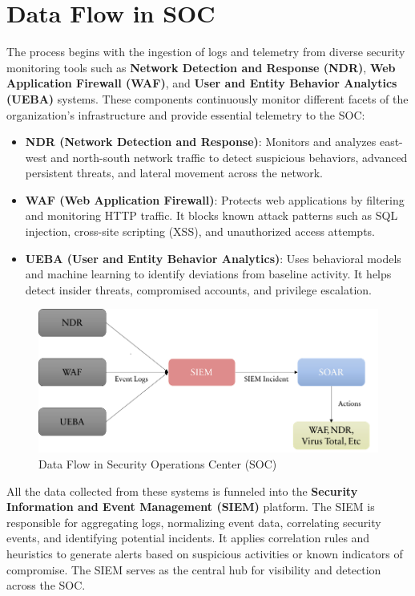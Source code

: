 \section{Data Flow in SOC}

The process begins with the ingestion of logs and telemetry from diverse security monitoring tools such as \textbf{Network Detection and Response (NDR)}, \textbf{Web Application Firewall (WAF)}, and \textbf{User and Entity Behavior Analytics (UEBA)} systems. These components continuously monitor different facets of the organization’s infrastructure and provide essential telemetry to the SOC:

\begin{itemize}[itemsep=0pt,parsep=0pt,topsep=0pt,partopsep=0pt]
    \item \textbf{NDR (Network Detection and Response)}: Monitors and analyzes east-west and north-south network traffic to detect suspicious behaviors, advanced persistent threats, and lateral movement across the network.
    \item \textbf{WAF (Web Application Firewall)}: Protects web applications by filtering and monitoring HTTP traffic. It blocks known attack patterns such as SQL injection, cross-site scripting (XSS), and unauthorized access attempts.
    \item \textbf{UEBA (User and Entity Behavior Analytics)}: Uses behavioral models and machine learning to identify deviations from baseline activity. It helps detect insider threats, compromised accounts, and privilege escalation.
\end{itemize}

\begin{figure}[H]
    \centering
    \includegraphics[width=0.9\linewidth]{images/data_flow_soc.png}
    \caption{Data Flow in Security Operations Center (SOC)}
    \label{fig:data-flow-soc}
\end{figure}

All the data collected from these systems is funneled into the \textbf{Security Information and Event Management (SIEM)} platform. The SIEM is responsible for aggregating logs, normalizing event data, correlating security events, and identifying potential incidents. It applies correlation rules and heuristics to generate alerts based on suspicious activities or known indicators of compromise. The SIEM serves as the central hub for visibility and detection across the SOC.

